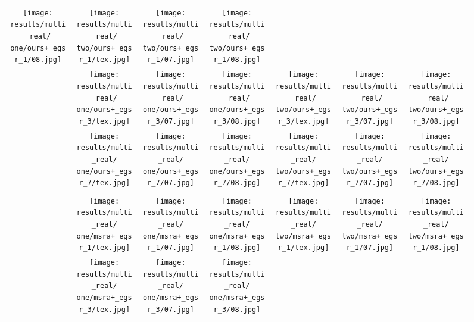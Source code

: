 \begin{figure*}[t]
\begin{tabular}{cccc@{\hspace{4\tabcolsep}}ccc}
		\texttt{[image: results/multi\_real/\\one/ours+\_egsr\_1/08.jpg]} &
		\texttt{[image: results/multi\_real/\\two/ours+\_egsr\_1/tex.jpg]} &
		\texttt{[image: results/multi\_real/\\two/ours+\_egsr\_1/07.jpg]} &
		\texttt{[image: results/multi\_real/\\two/ours+\_egsr\_1/08.jpg]}
		\\
		\raisebox{\raiseLen}{\rotatebox[origin=c]{90}{\footnotesize{Ours+ (3)}}} &
		\texttt{[image: results/multi\_real/\\one/ours+\_egsr\_3/tex.jpg]} &
		\texttt{[image: results/multi\_real/\\one/ours+\_egsr\_3/07.jpg]} &
		\texttt{[image: results/multi\_real/\\one/ours+\_egsr\_3/08.jpg]} &
		\texttt{[image: results/multi\_real/\\two/ours+\_egsr\_3/tex.jpg]} &
		\texttt{[image: results/multi\_real/\\two/ours+\_egsr\_3/07.jpg]} &
		\texttt{[image: results/multi\_real/\\two/ours+\_egsr\_3/08.jpg]}
		\\
		\raisebox{\raiseLen}{\rotatebox[origin=c]{90}{\footnotesize{Ours+ (7)}}} &
		\texttt{[image: results/multi\_real/\\one/ours+\_egsr\_7/tex.jpg]} &
		\texttt{[image: results/multi\_real/\\one/ours+\_egsr\_7/07.jpg]} &
		\texttt{[image: results/multi\_real/\\one/ours+\_egsr\_7/08.jpg]} &
		\texttt{[image: results/multi\_real/\\two/ours+\_egsr\_7/tex.jpg]} &
		\texttt{[image: results/multi\_real/\\two/ours+\_egsr\_7/07.jpg]} &
		\texttt{[image: results/multi\_real/\\two/ours+\_egsr\_7/08.jpg]}
		\\
		\hline\\[-8pt]
		\raisebox{\raiseLen}{\rotatebox[origin=c]{90}{\footnotesize{[Gao19]+ (1)}}} &
		\texttt{[image: results/multi\_real/\\one/msra+\_egsr\_1/tex.jpg]} &
		\texttt{[image: results/multi\_real/\\one/msra+\_egsr\_1/07.jpg]} &
		\texttt{[image: results/multi\_real/\\one/msra+\_egsr\_1/08.jpg]} &
		\texttt{[image: results/multi\_real/\\two/msra+\_egsr\_1/tex.jpg]} &
		\texttt{[image: results/multi\_real/\\two/msra+\_egsr\_1/07.jpg]} &
		\texttt{[image: results/multi\_real/\\two/msra+\_egsr\_1/08.jpg]}
		\\
		\raisebox{\raiseLen}{\rotatebox[origin=c]{90}{\footnotesize{[Gao19]+ (3)}}} &
		\texttt{[image: results/multi\_real/\\one/msra+\_egsr\_3/tex.jpg]} &
		\texttt{[image: results/multi\_real/\\one/msra+\_egsr\_3/07.jpg]} &
		\texttt{[image: results/multi\_real/\\one/msra+\_egsr\_3/08.jpg]} &

\end{tabular}
\end{figure*}
